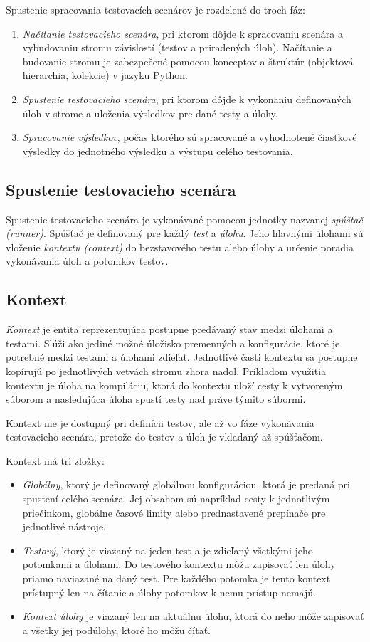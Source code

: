 \documentclass[
  digital, %
  oneside, %
  table,   %
  lof,     %
  lot,   %
]{fithesis3}
\begin{document}
Spustenie spracovania testovacích scenárov je rozdelené do troch fáz:
\begin{enumerate}
    \item \emph{Načítanie testovacieho scenára}, pri ktorom dôjde k spracovaniu scenára a vybudovaniu stromu závislostí (testov a priradených úloh). Načítanie a budovanie stromu je zabezpečené pomocou konceptov a štruktúr (objektová hierarchia, kolekcie) v jazyku Python.
    \item \emph{Spustenie testovacieho scenára}, pri ktorom dôjde k vykonaniu definovaných úloh v strome a uloženia výsledkov pre dané testy a úlohy.
    \item \emph{Spracovanie výsledkov}, počas ktorého sú spracované a vyhodnotené čiastkové výsledky do jednotného výsledku a výstupu celého testovania.
\end{enumerate}

\subsection{Spustenie testovacieho scenára}

Spustenie testovacieho scenára je vykonávané pomocou jednotky nazvanej \emph{spúšťač (runner)}. Spúšťač je definovaný pre každý \emph{test} a \emph{úlohu}. Jeho hlavnými úlohami sú vloženie \emph{kontextu (context)} do bezstavového testu alebo úlohy a určenie poradia vykonávania úloh a potomkov testov. 

\subsection{Kontext}

\emph{Kontext} je entita reprezentujúca postupne predávaný stav medzi úlohami a testami. Slúži ako jediné možné úložisko premenných a konfigurácie, ktoré je potrebné medzi testami a úlohami zdieľať. Jednotlivé časti kontextu sa postupne kopírujú po jednotlivých vetvách stromu zhora nadol. Príkladom využitia kontextu je úloha na kompiláciu, ktorá do kontextu uloží cesty k vytvoreným súborom a nasledujúca úloha spustí testy nad práve týmito súbormi.

Kontext nie je dostupný pri definícii testov, ale až vo fáze vykonávania testovacieho scenára, pretože do testov a úloh je vkladaný až spúšťačom.

Kontext má tri zložky:
\begin{itemize}
    \item \emph{Globálny}, ktorý je definovaný globálnou konfiguráciou, ktorá je predaná pri spustení celého scenára. Jej obsahom sú napríklad cesty k jednotlivým priečinkom, globálne časové limity alebo prednastavené prepínače pre jednotlivé nástroje. 
    \item \emph{Testový}, ktorý je viazaný na jeden test a je zdieľaný všetkými jeho potomkami a úlohami. Do testového kontextu môžu zapisovať len úlohy priamo naviazané na daný test. Pre každého potomka je tento kontext prístupný len na čítanie a úlohy potomkov k nemu prístup nemajú.
    \item \emph{Kontext úlohy} je viazaný len na aktuálnu úlohu, ktorá do neho môže zapisovať a všetky jej podúlohy, ktoré ho môžu čítať.
\end{itemize}
\end{document}
